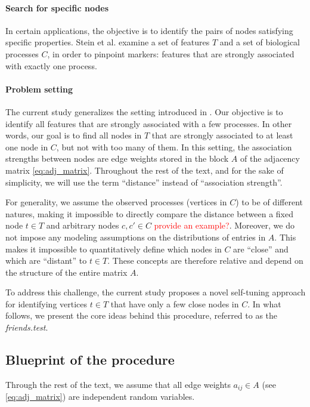 \documentclass{llncs}
\newcommand{\red}[1]{\textcolor{red}{#1}}
\begin{document}
\paragraph{Search for specific nodes} In certain applications, the objective is to identify the pairs of nodes satisfying specific properties. Stein et al. \cite{stein-obrien_patternmarkers_2017} examine a set of features $T$ and a set of biological processes 
$C$, in order to pinpoint markers: features that are strongly associated with exactly one process. 

\paragraph{Problem setting}
The current study generalizes the setting introduced in \cite{stein-obrien_patternmarkers_2017}. Our objective is to identify all features that are strongly associated with a few processes. In other words, our goal is to find all nodes in $T$ that are strongly associated to at least one node in $C$, but not with too many of them. In this setting, the association strengths between nodes are edge weights stored in the block $A$ of the adjacency matrix \eqref{eq:adj_matrix}. Throughout the rest of the text, and for the sake of simplicity, we will use the term ``distance'' instead of ``association strength''. 

For generality, we assume the observed processes (vertices in $C$) to be of different natures, making it impossible to directly compare the distance between a fixed node $t\in T$ and arbitrary nodes $c, c' \in C$ \red{provide an example?}.  Moreover, we do not impose any modeling assumptions on the distributions of entries in $A$. This makes it impossible to quantitatively define which nodes in $C$ are ``close'' and which are ``distant'' to $t\in T$. These concepts are therefore relative and depend on the structure of the entire matrix $A$.

To address this challenge, the current study proposes a novel self-tuning approach for identifying vertices $t \in T$ that have only a few close nodes in $C$. In what follows, we present the core ideas behind this procedure, referred to as the \textit{friends.test}.

\subsection{Blueprint of the procedure}
 
Through the rest of the text, we assume that all edge weights $a_{ij} \in A$ (see \eqref{eq:adj_matrix}) are independent random variables. 
\end{document}
